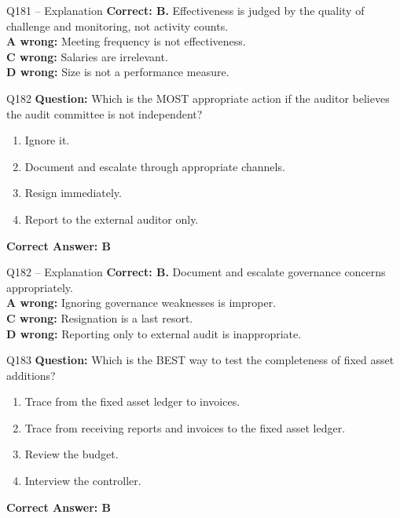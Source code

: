 \documentclass[aspectratio=169,10pt]{beamer}
\begin{document}
	\begin{frame}[t]{Q181 -- Explanation}
		\small
		\textbf{Correct: B.} Effectiveness is judged by the quality of challenge and monitoring, not activity counts. \\[4pt]
		\textbf{A wrong:} Meeting frequency is not effectiveness. \\[2pt]
		\textbf{C wrong:} Salaries are irrelevant. \\[2pt]
		\textbf{D wrong:} Size is not a performance measure.
	\end{frame}
	
	\begin{frame}[t]{Q182}
		\small
		\textbf{Question:} Which is the MOST appropriate action if the auditor believes the audit committee is not independent?
		\begin{enumerate}[label=\Alph*.,itemsep=1pt,topsep=2pt]
			\item Ignore it.
			\item Document and escalate through appropriate channels.
			\item Resign immediately.
			\item Report to the external auditor only.
		\end{enumerate}
		\vspace{4pt}
		\textbf{Correct Answer: B}
	\end{frame}
	
	\begin{frame}[t]{Q182 -- Explanation}
		\small
		\textbf{Correct: B.} Document and escalate governance concerns appropriately. \\[4pt]
		\textbf{A wrong:} Ignoring governance weaknesses is improper. \\[2pt]
		\textbf{C wrong:} Resignation is a last resort. \\[2pt]
		\textbf{D wrong:} Reporting only to external audit is inappropriate.
	\end{frame}
	
	\begin{frame}[t]{Q183}
		\small
		\textbf{Question:} Which is the BEST way to test the completeness of fixed asset additions?
		\begin{enumerate}[label=\Alph*.,itemsep=1pt,topsep=2pt]
			\item Trace from the fixed asset ledger to invoices.
			\item Trace from receiving reports and invoices to the fixed asset ledger.
			\item Review the budget.
			\item Interview the controller.
		\end{enumerate}
		\vspace{4pt}
		\textbf{Correct Answer: B}
	\end{frame}
	
\end{document}
